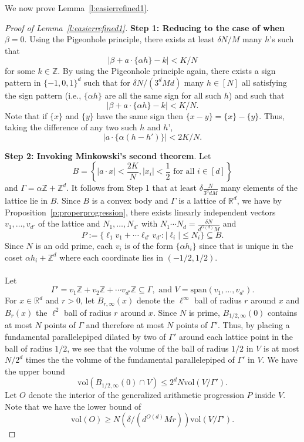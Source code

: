 \documentclass[11pt, a4paper]{amsart}
\theoremstyle{plain}
\theoremstyle{plain}
\theoremstyle{definition}
\theoremstyle{remark}
\numberwithin{equation}{section}
\numberwithin{lemma}{section}
\numberwithin{proposition}{section}
\numberwithin{corollary}{section}
\numberwithin{definition}{section}
\numberwithin{claim}{section}
\begin{document}
We now prove Lemma~\ref{l:easierrefined1}.
\begin{proof}[Proof of Lemma~\ref{l:easierrefined1}]
\textbf{Step 1: Reducing to the case of when $\beta = 0$}. Using the Pigeonhole principle, there exists at least $\delta N/M$ many $h$'s such that
$$|\beta + a \cdot \{\alpha h\} - k| < K/N$$
for some $k \in \mathbb{Z}$. By using the Pigeonhole principle again, there exists a sign pattern in $\{-1, 0, 1\}^{d}$ such that for $\delta N/(3^{d}Md)$ many $h \in [N]$ all satisfying the sign pattern (i.e., $\{\alpha h\}$ are all the same sign for all such $h$) and such that
$$|\beta + a \cdot \{\alpha h\} - k| < K/N.$$
Note that if $\{x\}$ and $\{y\}$ have the same sign then $\{x - y\} = \{x\} - \{y\}$. Thus, taking the difference of any two such $h$ and $h$',
$$|a \cdot \{\alpha (h - h')\}| < 2K/N.$$

\textbf{Step 2: Invoking Minkowski's second theorem}. Let 
$$B= \left\{|a \cdot x| < \frac{2K}{N}, |x_i| < \frac{1}{2} \text{ for all } i \in [d] \right\}$$
and $\Gamma =\alpha \mathbb{Z} + \mathbb{Z}^{d}$. It follows from Step 1 that at least $\delta \frac{N}{3^{d}dM}$ many elements of the lattice lie in $B$. Since $B$ is a convex body and $\Gamma$ is a lattice of $\mathbb{R}^d$, we have by Proposition~\ref{p:properprogression}, there exists linearly independent vectors $v_1, \dots, v_{d'}$ of the lattice and $N_1, \dots, N_{d'}$ with $N_1 \cdots N_d = \frac{\delta N}{d^{O(d)}M}$ and 
$$P := \{\ell_1v_1 + \cdots \ell_{d'} v_{d'}: |\ell_i| \le N_i\} \subseteq B.$$
Since $N$ is an odd prime, each $v_i$ is of the form $\{\alpha h_i\}$ since that is unique in the coset $\alpha h_i + \mathbb{Z}^d$ where each coordinate lies in $(-1/2, 1/2)$. \\\\
Let 
$$\Gamma' = v_1\mathbb{Z} + v_2\mathbb{Z} + \cdots v_{d'}\mathbb{Z} \subseteq \Gamma, \text{ and } V = \mathrm{span}(v_1, \dots, v_{d'}).$$
For $x \in \mathbb{R}^d$ and $r > 0$, let $B_{r, \infty}(x)$ denote the $\ell^\infty$ ball of radius $r$ around $x$ and $B_r(x)$ the $\ell^2$ ball of radius $r$ around $x$. Since $N$ is prime, $B_{1/2, \infty}(0)$ contains at most $N$ points of $\Gamma$ and therefore at most $N$ points of $\Gamma'$. Thus, by placing a fundamental parallelepiped dilated by two of $\Gamma'$ around each lattice point in the ball of radius $1/2$, we see that the volume of the ball of radius $1/2$ in $V$ is at most $N/2^d$ times the the volume of the fundamental parallelepiped of $\Gamma'$ in $V$. We have the upper bound
$$\mathrm{vol}(B_{1/2, \infty}(0)\cap V) \le 2^dN\mathrm{vol}(V/\Gamma').$$
Let $O$ denote the interior of the generalized arithmetic progression $P$ inside $V$. Note that we have the lower bound of
$$\mathrm{vol}(O) \ge N(\delta/(d^{O(d)}Mr)) \mathrm{vol}(V/\Gamma').$$


\end{proof}
\end{document}
